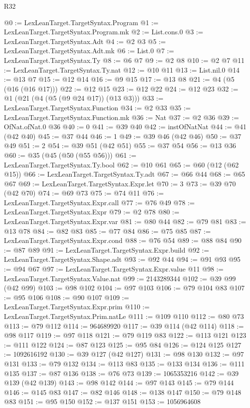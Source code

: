 \begin{lexlean}{R32}
\begin{coremodule}
@0 := LexLeanTarget.TargetSyntax.Program
@1 := LexLeanTarget.TargetSyntax.Program.mk
@2 := List.cons.{0}
@3 := LexLeanTarget.TargetSyntax.Adt
@4 := @2 @3
@5 := LexLeanTarget.TargetSyntax.Adt.mk
@6 := List.{0}
@7 := LexLeanTarget.TargetSyntax.Ty
@8 := @6 @7
@9 := @2 @8
@10 := @2 @7
@11 := LexLeanTarget.TargetSyntax.Ty.nat
@12 := @10 @11
@13 := List.nil.{0}
@14 := @13 @7
@15 := @12 @14
@16 := @9 @15
@17 := @13 @8
@21 := @4 (@5 (@16 (@16 @17)))
@22 := @12 @15
@23 := @12 @22
@24 := @12 @23
@32 := @1 (@21 (@4 (@5 (@9 @24 @17)) (@13 @3)))
@33 := LexLeanTarget.TargetSyntax.Function
@34 := @2 @33
@35 := LexLeanTarget.TargetSyntax.Function.mk
@36 := Nat
@37 := @2 @36
@39 := OfNat.ofNat.{0} @36
@40 := 0
@41 := @39 @40
@42 := instOfNatNat
@44 := @41 (@42 @40)
@45 := @37 @44
@46 := 1
@49 := @39 @46 (@42 @46)
@50 := @37 @49
@51 := 2
@54 := @39 @51 (@42 @51)
@55 := @37 @54
@56 := @13 @36
@60 := @35 (@45 (@50 (@55 @56)))
@61 := LexLeanTarget.TargetSyntax.Ty.bool
@62 := @10 @61
@65 := @60 (@12 (@62 @15))
@66 := LexLeanTarget.TargetSyntax.Ty.adt
@67 := @66 @44
@68 := @65 @67
@69 := LexLeanTarget.TargetSyntax.Expr.let
@70 := 3
@73 := @39 @70 (@42 @70)
@74 := @69 @73
@75 := @74 @11
@76 := LexLeanTarget.TargetSyntax.Expr.call
@77 := @76 @49
@78 := LexLeanTarget.TargetSyntax.Expr
@79 := @2 @78
@80 := LexLeanTarget.TargetSyntax.Expr.var
@81 := @80 @44
@82 := @79 @81
@83 := @13 @78
@84 := @82 @83
@85 := @77 @84
@86 := @75 @85
@87 := LexLeanTarget.TargetSyntax.Expr.cond
@88 := @76 @54
@89 := @88 @84
@90 := @87 @89
@91 := LexLeanTarget.TargetSyntax.Expr.build
@92 := LexLeanTarget.TargetSyntax.Shape.adt
@93 := @92 @44
@94 := @91 @93
@95 := @94 @67
@97 := LexLeanTarget.TargetSyntax.Expr.value @11
@98 := LexLeanTarget.TargetSyntax.Value.nat
@99 := 2143289344
@102 := @39 @99 (@42 @99)
@103 := @98 @102
@104 := @97 @103
@106 := @79 @104 @83
@107 := @95 @106
@108 := @90 @107
@109 := LexLeanTarget.TargetSyntax.Expr.prim
@110 := LexLeanTarget.TargetSyntax.Prim.natLe
@111 := @109 @110
@112 := @80 @73
@113 := @79 @112
@114 := 964689920
@117 := @39 @114 (@42 @114)
@118 := @98 @117
@119 := @97 @118
@121 := @79 @119 @83
@122 := @113 @121
@123 := @111 @122
@124 := @87 @123
@125 := @95 @84
@126 := @124 @125
@127 := 1092616192
@130 := @39 @127 (@42 @127)
@131 := @98 @130
@132 := @97 @131
@133 := @79 @132
@134 := @113 @83
@135 := @133 @134
@136 := @111 @135
@137 := @87 @136
@138 := @76 @73
@139 := 1065353216
@142 := @39 @139 (@42 @139)
@143 := @98 @142
@144 := @97 @143
@145 := @79 @144
@146 := @145 @83
@147 := @82 @146
@148 := @138 @147
@150 := @79 @148 @83
@151 := @95 @150
@152 := @137 @151
@153 := 1056964608

\end{coremodule}
\end{lexlean}
